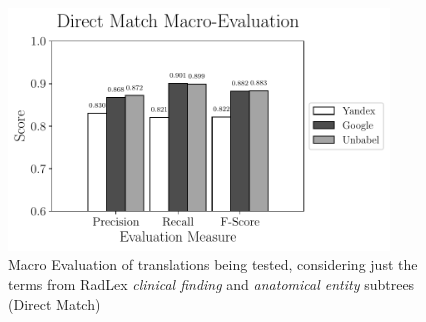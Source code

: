 \begin{figure}[ht]
	\centering
	\includegraphics[width=0.9\textwidth]{SupportFiles/plots/direct_match_macro_clinical_anatomical_subtrees_plot.pdf}
	\caption{Macro Evaluation of translations being tested, considering just the terms from RadLex \textit{clinical finding} and \textit{anatomical entity} subtrees (Direct Match)}
	\label{app:macro_eval_subtrees_direct}
\end{figure}

